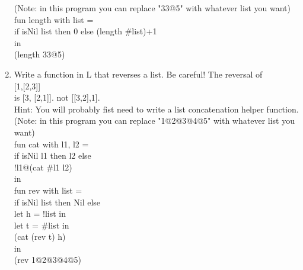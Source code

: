 \documentclass[11pt]{article}
\begin{document}
\begin{enumerate}
(Note: in this program you can replace "33@5" with whatever list you want)\\

fun length with list =\\ 
if isNil list then 0 else (length #list)+1\\
in \\
(length 33@5)\\

\item Write a function in L that reverses a list. Be careful! The reversal of\\

[1,[2,3]]\\
is [3, [2,1]]. not [[3,2],1].\\

Hint: You will probably fist need to write a list concatenation helper function.\\

(Note: in this program you can replace "1@2@3@4@5" with whatever list you want)\\

fun cat with l1, l2 =\\
if isNil l1 then l2 else\\
!l1@(cat #l1 l2)\\
in\\

fun rev with list =\\ 
if isNil list then Nil else\\
let h = !list in\\
let t = #list in\\
(cat (rev t) h)\\
in\\
(rev 1@2@3@4@5)\\
\end{enumerate}
\end{document}

